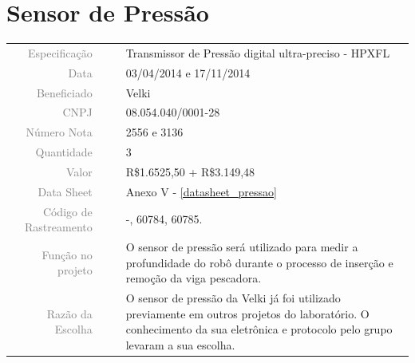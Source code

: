 

\section{Sensor de Pressão}
\label{pressao}


\begin{table}[ht!]

	\begin{tabular}{r l|l p{12cm} }
		
		\textcolor{gray}{Especificação} &&& 	{Transmissor de Pressão digital
		ultra-preciso - HPXFL}\\
		\textcolor{gray}{Data} &&& 				{03/04/2014 e 17/11/2014}\\
        \textcolor{gray}{Beneficiado} &&&		{Velki} \\
        \textcolor{gray}{CNPJ} &&& 				{08.054.040/0001-28} \\
        \textcolor{gray}{Número Nota} &&& 		{2556 e 3136} \\
		\textcolor{gray}{Quantidade} &&& 		{3} \\
		\textcolor{gray}{Valor} &&& 			{R\$1.6525,50 + R\$3.149,48} \\
		\textcolor{gray}{Data Sheet} &&& 		{Anexo V - \ref{datasheet_pressao} } \\
		\textcolor{gray}{Código de Rastreamento} &&& {-, 60784, 60785.} \\

		\textcolor{gray}{Função no projeto} &&& {O sensor de pressão será utilizado
		para medir a profundidade do robô durante o processo de inserção e remoção da
		viga pescadora.} \\
		\textcolor{gray}{Razão da Escolha} &&& {O sensor de pressão da Velki já foi
		utilizado previamente em outros projetos do laboratório. O conhecimento da sua
		eletrônica e protocolo pelo grupo levaram a sua escolha.}
		
		

	\end{tabular}
\end{table}

\newpage
